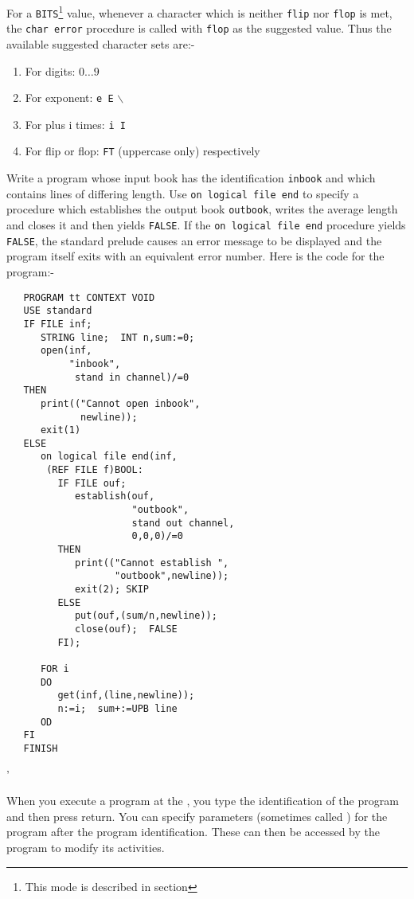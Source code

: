 For a \verb|BITS|\footnote{This mode is described in section
} value, whenever a character which is neither \verb|flip|
nor \verb|flop| is met, the \verb|char error| procedure is called
with \verb|flop| as the suggested value. Thus the available suggested
character sets are:-
\begin{enumerate}
\item For digits: $0\ldots9$
\item For exponent: \verb|e E| $\backslash$
\item For plus i times: \verb|i I|
\item For flip or flop: \verb|FT| (uppercase only) respectively
\end{enumerate}

\begin{exercise}
\item Write a program whose input book has the identification
\verb|inbook| and which contains lines of differing length. Use
\verb|on logical file end| to specify a procedure which establishes
the output book \verb|outbook|, writes the average length and closes
it and then yields \verb|FALSE|. \ans If the
\verb|on logical file end| procedure yields
\verb|FALSE|, the standard prelude causes an error message to be
displayed and the program itself exits with an equivalent error
number. Here is the code for the program:-
\begin{verbatim}
   PROGRAM tt CONTEXT VOID
   USE standard
   IF FILE inf;
      STRING line;  INT n,sum:=0;
      open(inf,
           "inbook",
            stand in channel)/=0
   THEN
      print(("Cannot open inbook",
             newline));
      exit(1)
   ELSE
      on logical file end(inf,
       (REF FILE f)BOOL:
         IF FILE ouf;
            establish(ouf,
                      "outbook",
                      stand out channel,
                      0,0,0)/=0
         THEN
            print(("Cannot establish ",
                   "outbook",newline));
            exit(2); SKIP
         ELSE
            put(ouf,(sum/n,newline));
            close(ouf);  FALSE
         FI);

      FOR i
      DO
         get(inf,(line,newline));
         n:=i;  sum+:=UPB line
      OD
   FI  
   FINISH
\end{verbatim}
'
\end{exercise}

When you execute a program at the , you type the
identification of the program and then press return.  You can specify
parameters (sometimes called ) for
the program after the program identification.  These can then be
accessed by the program to modify its activities.

